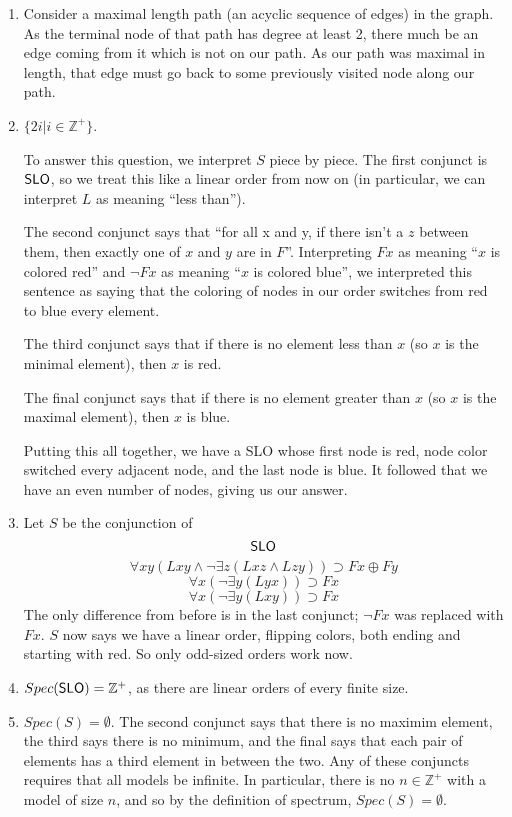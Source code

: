 \begin{mdframed}[linewidth=1]
\begin{enumerate}
    \item Consider a maximal length path (an acyclic sequence of edges) in the graph. As the terminal node of that path has degree at least 2, there much be an edge coming from it which is not on our path. As our path was maximal in length, that edge must go back to some previously visited node along our path.   

    \item $\{2i | i \in \mathbb{Z}^+\}$. 

   To answer this question, we interpret $S$ piece by piece. The first conjunct is $\mbox{$\mathsf{SLO}$}$, so we treat this like a linear order from now on (in particular, we can interpret $L$ as meaning ``less than''). 

   The second conjunct says that ``for all x and y, if there isn't a $z$ between them, then exactly one of $x$ and $y$ are in $F$''. Interpreting $Fx$ as meaning ``$x$ is colored red'' and $\lnot Fx$ as meaning ``$x$ is colored blue'', we interpreted this sentence as saying that the coloring of nodes in our order switches from red to blue every element. 

   The third conjunct says that if there is no element less than $x$ (so $x$ is the minimal element), then $x$ is red.

   The final conjunct says that if there is no element greater than $x$ (so $x$ is the maximal element), then $x$ is blue. 

   Putting this all together, we have a SLO whose first node is red, node color switched every adjacent node, and the last node is blue. It followed that we have an even number of nodes, giving us our answer.  

    \item Let $S$ be the conjunction of 
    \[
       \mbox{$\mathsf{SLO}$}
   \]
   \[
       \forall xy(Lxy \land \lnot \exists z(Lxz \land Lzy)) \supset Fx \oplus Fy
   \]
   \[
       \forall x(\lnot \exists y(Lyx))\supset Fx
   \]
   \[
       \forall x(\lnot \exists y(Lxy))\supset Fx
   \]
   The only difference from before is in the last conjunct; $\lnot Fx$ was replaced with $Fx$. $S$ now says we have a linear order, flipping colors, both ending and starting with red. So only odd-sized orders work now.

    \item $Spec(\mbox{$\mathsf{SLO}$}) = \mathbb{Z}^+$, as there are linear orders of every finite size. 

    \item $Spec(S) = \emptyset$. The second conjunct says that there is no maximim element, the third says there is no minimum, and the final says that each pair of elements has a third element in between the two. Any of these conjuncts requires that all models be infinite. In particular, there is no $n \in \mathbb{Z}^+$ with a model of size $n$, and so by the definition of spectrum, $Spec(S) = \emptyset$. 


\end{enumerate}
\end{mdframed}
